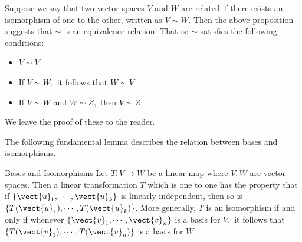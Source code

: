 Suppose we say that two vector spaces $V$ and $W$ are related if there exists an isomorphism of one to the other, written as $V\sim W$. 
Then the above proposition suggests that $\sim $ is an equivalence relation. That is: $\sim $
satisfies the following conditions:

\begin{itemize}
\item $V\sim V$

\item If $V\sim W,$ it follows that $W\sim V$

\item If $V\sim W$ and $W\sim Z,$ then $V\sim Z$
\end{itemize}

We leave the proof of these to the reader. 

The following fundamental lemma describes the relation between bases and
isomorphisms.

\begin{lemma}{Bases and Isomorphisms}\label{lem:basesisomorphism}
Let $T:V\rightarrow W$ be a
 linear map where $V,W$ are vector spaces.  Then a linear transformation $T$ which is one to one has the property that
if $\left\{ \vect{u}_{1},\cdots ,\vect{u}_{k}\right\} $ is linearly
independent, then so is $\left\{ T(\vect{u}_{1}),\cdots ,T(\vect{u}_{k})\right\} $.
 More generally, $T$ is an
isomorphism if and only if whenever $\left\{ 
\vect{v}_{1},\cdots ,\vect{v}_{n}\right\} $ is a basis for $V,$ it follows
that $\left\{ T(\vect{v}_{1}),\cdots ,T(\vect{v}_{n})\right\} $ is a basis for $W$.
\end{lemma}

